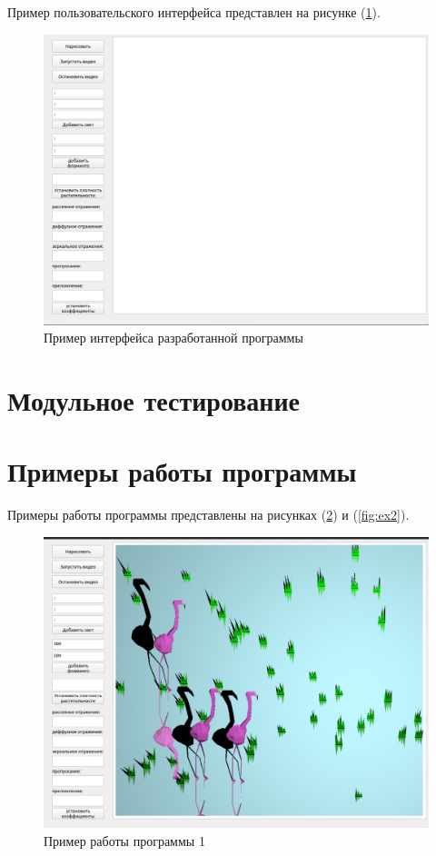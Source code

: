 Пример пользовательского интерфейса представлен на рисунке (\ref{fig:inter}).
	
\begin{figure}[h!]
	\centering
	\includegraphics[width=0.96\linewidth]{img/inter}
	\caption{Пример интерфейса разработанной программы}
	\label{fig:inter}
\end{figure}

\section{Модульное тестирование}

\section{Примеры работы программы}

Примеры работы программы представлены на рисунках (\ref{fig:ex1}) и (\ref{fig:ex2}).
	
\begin{figure}[h!]
	\centering
	\includegraphics[width=0.9\linewidth]{img/ex1}
	\caption{Пример работы программы 1}
	\label{fig:ex1}
\end{figure}
	
